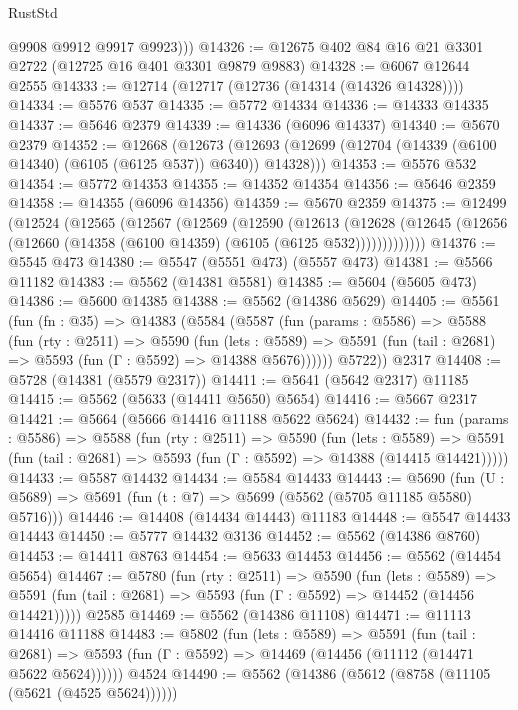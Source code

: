 \begin{lexlean}{RustStd}
\begin{coremodule}
          @9908
          @9912
          @9917
          @9923)))
@14326 := @12675 @402 @84 @16 @21 @3301 @2722 (@12725 @16 @401 @3301 @9879 @9883)
@14328 := @6067 @12644 @2555
@14333 := @12714 (@12717 (@12736 (@14314 (@14326 @14328))))
@14334 := @5576 @537
@14335 := @5772 @14334
@14336 := @14333 @14335
@14337 := @5646 @2379
@14339 := @14336 (@6096 @14337)
@14340 := @5670 @2379
@14352 := @12668
    (@12673 (@12693 (@12699 (@12704 (@14339 (@6100 @14340) (@6105 (@6125 @537)) @6340)) @14328)))
@14353 := @5576 @532
@14354 := @5772 @14353
@14355 := @14352 @14354
@14356 := @5646 @2359
@14358 := @14355 (@6096 @14356)
@14359 := @5670 @2359
@14375 := @12499
    (@12524
      (@12565
        (@12567
          (@12569
            (@12590
              (@12613
                (@12628
                  (@12645 (@12656 (@12660 (@14358 (@6100 @14359) (@6105 (@6125 @532)))))))))))))
@14376 := @5545 @473
@14380 := @5547 (@5551 @473) (@5557 @473)
@14381 := @5566 @11182
@14383 := @5562 (@14381 @5581)
@14385 := @5604 (@5605 @473)
@14386 := @5600 @14385
@14388 := @5562 (@14386 @5629)
@14405 := @5561
    (fun (fn : @35) =>
    @14383
      (@5584
        (@5587
          (fun (params : @5586) =>
          @5588
            (fun (rty : @2511) =>
            @5590
              (fun (lets : @5589) =>
              @5591 (fun (tail : @2681) => @5593 (fun (Γ : @5592) => @14388 @5676))))))
        @5722))
    @2317
@14408 := @5728 (@14381 (@5579 @2317))
@14411 := @5641 (@5642 @2317) @11185
@14415 := @5562 (@5633 (@14411 @5650) @5654)
@14416 := @5667 @2317
@14421 := @5664 (@5666 @14416 @11188 @5622 @5624)
@14432 := fun (params : @5586) =>
  @5588
    (fun (rty : @2511) =>
    @5590
      (fun (lets : @5589) =>
      @5591 (fun (tail : @2681) => @5593 (fun (Γ : @5592) => @14388 (@14415 @14421)))))
@14433 := @5587 @14432
@14434 := @5584 @14433
@14443 := @5690
    (fun (U : @5689) => @5691 (fun (t : @7) => @5699 (@5562 (@5705 @11185 @5580) @5716)))
@14446 := @14408 (@14434 @14443) @11183
@14448 := @5547 @14433 @14443
@14450 := @5777 @14432 @3136
@14452 := @5562 (@14386 @8760)
@14453 := @14411 @8763
@14454 := @5633 @14453
@14456 := @5562 (@14454 @5654)
@14467 := @5780
    (fun (rty : @2511) =>
    @5590
      (fun (lets : @5589) =>
      @5591 (fun (tail : @2681) => @5593 (fun (Γ : @5592) => @14452 (@14456 @14421)))))
    @2585
@14469 := @5562 (@14386 @11108)
@14471 := @11113 @14416 @11188
@14483 := @5802
    (fun (lets : @5589) =>
    @5591
      (fun (tail : @2681) =>
      @5593 (fun (Γ : @5592) => @14469 (@14456 (@11112 (@14471 @5622 @5624))))))
    @4524
@14490 := @5562 (@14386 (@5612 (@8758 (@11105 (@5621 (@4525 @5624))))))

\end{coremodule}
\end{lexlean}
